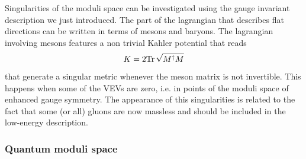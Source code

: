 Singularities of the moduli space can be investigated using the gauge invariant description we just introduced.
The part of the lagrangian that describes flat directions can be written in terms of mesons and baryons. 
The lagrangian involving mesons features a non trivial Kahler potential that reads
\begin{equation}
  K = 2 \mathrm{Tr } \, \sqrt{ M^{\dagger} M}
 \end{equation} 
that generate a singular metric whenever the meson matrix is not invertible. 
This happens when some of the VEVs are zero, i.e. in points of the moduli space of enhanced gauge symmetry.
The appearance of this singularities is related to the fact that
some (or all) gluons are now massless and should be included in the low-energy description.




\subsubsection{Quantum moduli space}

